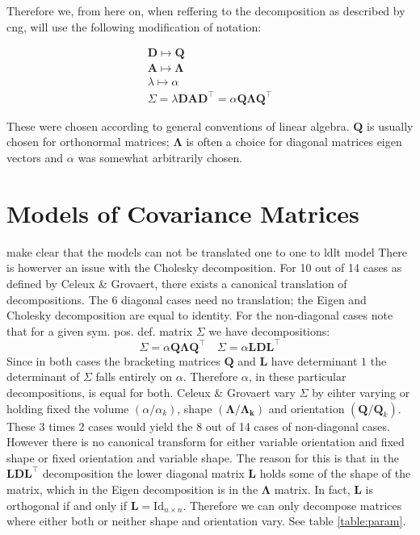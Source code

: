 Therefore we, from here on, when reffering to the decomposition as described by 
cng, will use the following modification of notation:

\begin{gather*} 
    \pmb{D} \longmapsto \pmb{Q} \\
    \pmb{A} \longmapsto \pmb{\Lambda} \\
    \lambda \longmapsto \alpha  \\
    \Sigma = \lambda \pmb{D} \pmb{A} \pmb{D}^\top =
        \alpha \pmb{Q} \pmb{\Lambda} \pmb{Q}^\top
\end{gather*}

These were chosen according to general conventions of linear algebra. $ \pmb{Q} $
is usually chosen for orthonormal matrices; $ \pmb{\Lambda} $ is often a choice 
for diagonal matrices eigen vectors and $ \alpha $ was somewhat arbitrarily 
chosen.


\section{Models of Covariance Matrices}

make clear that the models can not be translated one to one to ldlt model
There is howerver an issue with the Cholesky decomposition. For 10 out of 14
cases as defined by Celeux \& Grovaert, there exists a canonical translation of
decompositions.
The 6 diagonal cases need no translation; the Eigen and Cholesky decomposition
are equal to identity.
For the non-diagonal cases note that for a given sym. pos. def. matrix
$ \Sigma $ we have decompositions:
\[\Sigma = \alpha \pmb{Q \Lambda Q}^\top \quad \Sigma =\alpha \pmb{L D L}^\top\]
Since in both cases the bracketing matrices $ \pmb{Q} $ and $ \pmb{L} $ have 
determinant $ 1 $ the determinant of $ \Sigma $ falls entirely on $ \alpha $.
Therefore $ \alpha $, in these particular decompositions, is equal for both.
Celeux \& Grovaert vary $\Sigma$ by eihter varying or holding fixed the volume 
$(\alpha / \alpha_k)$, shape $(\pmb{\Lambda} / \pmb{\Lambda_k})$ and orientation
$(\pmb{Q} / \pmb{Q}_k)$.
These 3 times 2 cases would yield the 8 out of 14 cases of non-diagonal cases.
However there is no canonical transform for either variable orientation and 
fixed shape or fixed orientation and variable shape.
The reason for this is that in the $\pmb{LDL}^\top$ decomposition the lower
diagonal matrix $\pmb{L}$ holds some of the shape of the matrix, which in 
the Eigen decomposition is in the $\pmb{\Lambda}$ matrix.
In fact, $\pmb{L}$ is orthogonal if and only if 
$\pmb{L} = \mathrm{Id}_{n\times n}$.
Therefore we can only decompose matrices where either both or neither shape and
orientation vary. See table \ref{table:param}.

